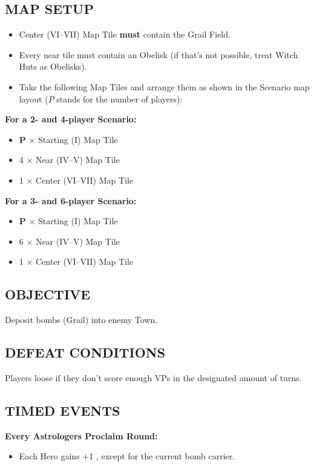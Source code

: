 \begin{multicols}{2}
\subsection*{\MakeUppercase{Map Setup}}
\begin{itemize}
  \item Center (VI--VII) Map Tile \textbf{must} contain the Grail Field.
  \item Every near tile must contain an Obelisk (if that's not possible, treat Witch Huts as Obelisks).
  \item Take the following Map Tiles and arrange them as shown in the Scenario map layout ($P$ stands for the number of players):
\end{itemize}

\textbf{For a 2- and 4-player Scenario:}
\begin{itemize}
  \item $\boldsymbol{P}$ × Starting (I) Map Tile
  \item 4 × Near (IV--V) Map Tile
  \item 1 × Center (VI--VII) Map Tile
\end{itemize}

\textbf{For a 3- and 6-player Scenario:}
\begin{itemize}
  \item $\boldsymbol{P}$ × Starting (I) Map Tile
  \item 6 × Near (IV--V) Map Tile
  \item 1 × Center (VI--VII) Map Tile
\end{itemize}

\subsection*{\MakeUppercase{Objective}}
Deposit bombs (Grail) into enemy Town.

\subsection*{\MakeUppercase{Defeat Conditions}}
Players loose if they don't score enough VPs in the designated amount of turns.

\subsection*{\MakeUppercase{Timed Events}}

\textbf{Every Astrologers Proclaim Round:}
\begin{itemize}
  \item Each Hero gains +1 , except for the current bomb carrier.
\end{itemize}


\end{multicols}

